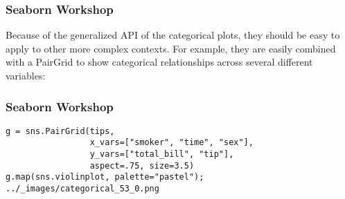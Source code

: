 \begin{frame}[fragile]
	\frametitle{Seaborn Workshop}
	\large
	
Because of the generalized API of the categorical plots, they should be easy to apply to other more complex contexts. For example, they are easily combined with a PairGrid to show categorical relationships across several different variables:
\end{frame}
\begin{frame}[fragile]
	\frametitle{Seaborn Workshop}
	\large
	\begin{verbatim}
g = sns.PairGrid(tips,
                 x_vars=["smoker", "time", "sex"],
                 y_vars=["total_bill", "tip"],
                 aspect=.75, size=3.5)
g.map(sns.violinplot, palette="pastel");
../_images/categorical_53_0.png
\end{verbatim}
\end{frame}

